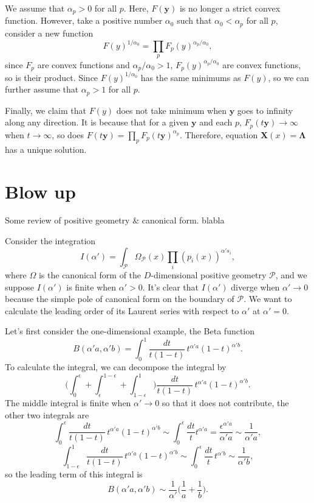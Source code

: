 \documentclass[12pt]{article}
\theoremstyle{definition}
\theoremstyle{plain}
\begin{document}
We assume that $\alpha_p>0$ for all $p$. Here, $F(\mathbf y)$ is no longer a strict convex function. However, take a positive number $\alpha_0$ such that $\alpha_0< \alpha_p$ for all $p$, consider a new function
\[
	F(y)^{1/\alpha_0}=\prod_p F_p(y)^{\alpha_p/\alpha_0},
\]
since $F_p$ are convex functions and $\alpha_p/\alpha_0>1$, $F_p(y)^{\alpha_p/\alpha_0}$ are convex functions, so is their product. Since $F(y)^{1/\alpha_0}$ has the same minimums as $F(y)$, so we can further assume that $\alpha_p>1$ for all $p$.

Finally, we claim that $F(y)$ does not take minimum when $\mathbf{y}$ goes to infinity along any direction. It is because that for a given $\mathbf{y}$ and each $p$, $F_p(t\mathbf{y})\to \infty$ when $t\to \infty$, so does $F(t\mathbf{y})=\prod_p F_p(t\mathbf{y})^{\alpha_p}$. Therefore, equation $\mathbf{X}(x)=\mathbf{\Lambda}$ has a unique solution.

\section{Blow up}

Some review of positive geometry \& canonical form. blabla

Consider the integration
\[
	I(\alpha')=\int_{\mathcal P} \Omega_{\mathcal P}(x)\prod_i(p_i(x))^{\alpha' s_i},
\]
where $\Omega$ is the canonical form of the $D$-dimensional positive geometry $\mathcal P$, and we suppose $I(\alpha')$ is finite when $\alpha'>0$.
It's clear that $I(\alpha')$ diverge when $\alpha'\to 0$ because the simple pole of canonical form on the boundary of $\mathcal P$. We want to calculate the leading order of its Laurent series with respect to $\alpha'$ at $\alpha'=0$. %


Let's first consider the one-dimensional example, the Beta function 
\[
	B(\alpha' a,\alpha' b)=\int_0^1 \frac{dt}{t(1-t)}\, t^{\alpha' a}(1-t)^{\alpha' b}.
\]
To calculate the integral, we can decompose the integral by 
\[
	\biggl(\int_{0}^\epsilon +\int_\epsilon^{1-\epsilon}+\int_{1-\epsilon}^1\biggr) \frac{dt}{t(1-t)}\, t^{\alpha' a}(1-t)^{\alpha' b}.
\]
The middle integral is finite when $\alpha'\to 0$ so that it does not contribute, the other two integrals are
	\[
		\int_0^\epsilon  \frac{dt}{t(1-t)}\, t^{\alpha' a}(1-t)^{\alpha' b}
	\sim \int_0^\epsilon \frac{dt}t t^{\alpha' a} 
	= \frac{\epsilon^{\alpha' a}}{\alpha'a} \sim \frac{1}{\alpha'a},
	\]
\[
	\int_{1-\epsilon}^1  \frac{dt}{t(1-t)}\, t^{\alpha' a}(1-t)^{\alpha' b}
	\sim \int_0^\epsilon \frac{dt}{t}\, t^{\alpha' b} \sim \frac{1}{\alpha' b},
\]
so the leading term of this integral is 
\[
	B(\alpha' a,\alpha' b)\sim\frac 1{\alpha'}\biggl(\frac 1a+\frac 1b\biggr).
\]
\end{document}

